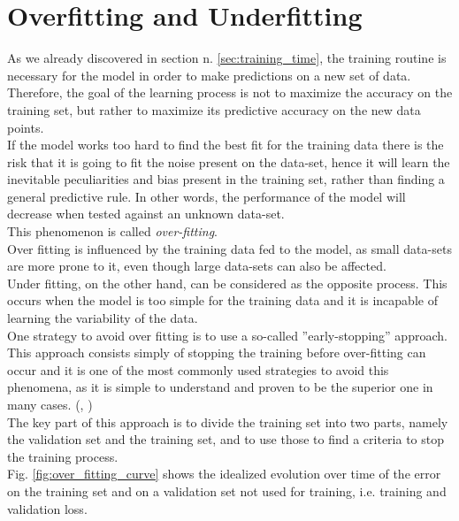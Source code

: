 



\section{Overfitting and Underfitting }\label{sec:of_uf}
As we already discovered in section n. \ref{sec:training_time}, the training routine is necessary for the model in order to make predictions on a new set of data. Therefore, the goal of the learning process is not to maximize the accuracy on the training set, but rather to maximize its predictive accuracy on the new data points. \citep{dietterich1995overfitting}\\
If the model works too hard to find the best fit for the training data there is the risk that it is going to fit the noise present on the data-set, hence it will learn the inevitable peculiarities and bias present in the training set, rather than finding a general predictive rule. In other words, the performance of the model will decrease when tested against an unknown data-set. \cite{jabbar2015methods}\\ This phenomenon is called \textit{over-fitting}. \citep{dietterich1995overfitting}\\
Over fitting is influenced by the training data fed to the model, as small data-sets are more prone to it, even though large data-sets can also be affected. \cite{10.1016/j.inffus.2008.11.003}\\
Under fitting, on the other hand, can be considered as the opposite process. This occurs when the model is too simple for the training data and it is incapable of learning the variability of the data. \cite{10.1016/j.inffus.2008.11.003}\\

One strategy to avoid over fitting is to use a so-called ''early-stopping'' approach. This approach consists simply of stopping the training before over-fitting can occur and it is one of the most commonly used strategies to avoid this phenomena, as it is simple to understand and proven to be the superior one in many cases. (\citep{FINNOFF1993771},  \cite{early_stopping}) \\
The key part of this approach is to divide the training set into two parts, namely the validation set and the training set, and to use those to find a criteria to stop the training process. \\
Fig. \ref{fig:over_fitting_curve} shows the idealized evolution over time of the error on the training set and on a validation set not used for training, i.e. training and validation loss. \cite{early_stopping}

